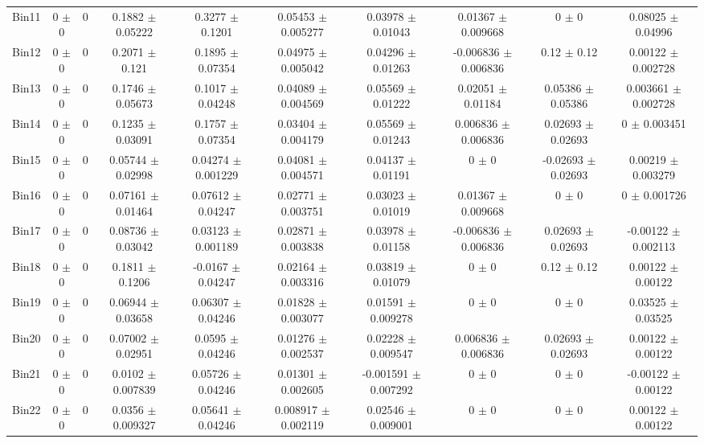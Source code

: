 \begin{tabular}{@{\extracolsep{4pt}}lccccccccc@{}}
     Bin11 & 0 $\pm$ 0 & 0 & 0.1882 $\pm$ 0.05222 & 0.3277 $\pm$ 0.1201 & 0.05453 $\pm$ 0.005277 & 0.03978 $\pm$ 0.01043 & 0.01367 $\pm$ 0.009668 & 0 $\pm$ 0 & 0.08025 $\pm$ 0.04996 \\ 
     Bin12 & 0 $\pm$ 0 & 0 & 0.2071 $\pm$ 0.121 & 0.1895 $\pm$ 0.07354 & 0.04975 $\pm$ 0.005042 & 0.04296 $\pm$ 0.01263 & -0.006836 $\pm$ 0.006836 & 0.12 $\pm$ 0.12 & 0.00122 $\pm$ 0.002728 \\ 
     Bin13 & 0 $\pm$ 0 & 0 & 0.1746 $\pm$ 0.05673 & 0.1017 $\pm$ 0.04248 & 0.04089 $\pm$ 0.004569 & 0.05569 $\pm$ 0.01222 & 0.02051 $\pm$ 0.01184 & 0.05386 $\pm$ 0.05386 & 0.003661 $\pm$ 0.002728 \\ 
     Bin14 & 0 $\pm$ 0 & 0 & 0.1235 $\pm$ 0.03091 & 0.1757 $\pm$ 0.07354 & 0.03404 $\pm$ 0.004179 & 0.05569 $\pm$ 0.01243 & 0.006836 $\pm$ 0.006836 & 0.02693 $\pm$ 0.02693 & 0 $\pm$ 0.003451 \\ 
     Bin15 & 0 $\pm$ 0 & 0 & 0.05744 $\pm$ 0.02998 & 0.04274 $\pm$ 0.001229 & 0.04081 $\pm$ 0.004571 & 0.04137 $\pm$ 0.01191 & 0 $\pm$ 0 & -0.02693 $\pm$ 0.02693 & 0.00219 $\pm$ 0.003279 \\ 
     Bin16 & 0 $\pm$ 0 & 0 & 0.07161 $\pm$ 0.01464 & 0.07612 $\pm$ 0.04247 & 0.02771 $\pm$ 0.003751 & 0.03023 $\pm$ 0.01019 & 0.01367 $\pm$ 0.009668 & 0 $\pm$ 0 & 0 $\pm$ 0.001726 \\ 
     Bin17 & 0 $\pm$ 0 & 0 & 0.08736 $\pm$ 0.03042 & 0.03123 $\pm$ 0.001189 & 0.02871 $\pm$ 0.003838 & 0.03978 $\pm$ 0.01158 & -0.006836 $\pm$ 0.006836 & 0.02693 $\pm$ 0.02693 & -0.00122 $\pm$ 0.002113 \\ 
     Bin18 & 0 $\pm$ 0 & 0 & 0.1811 $\pm$ 0.1206 & -0.0167 $\pm$ 0.04247 & 0.02164 $\pm$ 0.003316 & 0.03819 $\pm$ 0.01079 & 0 $\pm$ 0 & 0.12 $\pm$ 0.12 & 0.00122 $\pm$ 0.00122 \\ 
     Bin19 & 0 $\pm$ 0 & 0 & 0.06944 $\pm$ 0.03658 & 0.06307 $\pm$ 0.04246 & 0.01828 $\pm$ 0.003077 & 0.01591 $\pm$ 0.009278 & 0 $\pm$ 0 & 0 $\pm$ 0 & 0.03525 $\pm$ 0.03525 \\ 
     Bin20 & 0 $\pm$ 0 & 0 & 0.07002 $\pm$ 0.02951 & 0.0595 $\pm$ 0.04246 & 0.01276 $\pm$ 0.002537 & 0.02228 $\pm$ 0.009547 & 0.006836 $\pm$ 0.006836 & 0.02693 $\pm$ 0.02693 & 0.00122 $\pm$ 0.00122 \\ 
     Bin21 & 0 $\pm$ 0 & 0 & 0.0102 $\pm$ 0.007839 & 0.05726 $\pm$ 0.04246 & 0.01301 $\pm$ 0.002605 & -0.001591 $\pm$ 0.007292 & 0 $\pm$ 0 & 0 $\pm$ 0 & -0.00122 $\pm$ 0.00122 \\ 
     Bin22 & 0 $\pm$ 0 & 0 & 0.0356 $\pm$ 0.009327 & 0.05641 $\pm$ 0.04246 & 0.008917 $\pm$ 0.002119 & 0.02546 $\pm$ 0.009001 & 0 $\pm$ 0 & 0 $\pm$ 0 & 0.00122 $\pm$ 0.00122 \\ 

\end{tabular}
